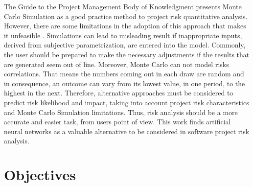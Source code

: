 The Guide to the Project Management Body of Knowledgment \cite{PMBOK2008} presents Monte Carlo Simulation as a good practice method to project risk quantitative analysis. However, there are some limitations in the adoption of this approach that makes it unfeasible \cite{Ibbotson2005}. Simulations can lead to misleading result if inappropriate inputs, derived from subjective parametrization, are entered into the model. Commonly, the user should be prepared to make the necessary adjustments if the results that are generated seem out of line. Moreover, Monte Carlo can not model risks correlations. That means the numbers coming out in each draw are random and in consequence, an outcome can vary from its lowest value, in one period, to the highest in the next. Therefore, alternative approaches must be considered to predict risk likelihood and impact, taking into account project risk characteristics and Monte Carlo Simulation limitations. Thus, risk analysis should be a more accurate and easier task, from users point of view. This work finds artificial neural networks as a valuable alternative to be considered in software project risk analysis.

\section{Objectives}

